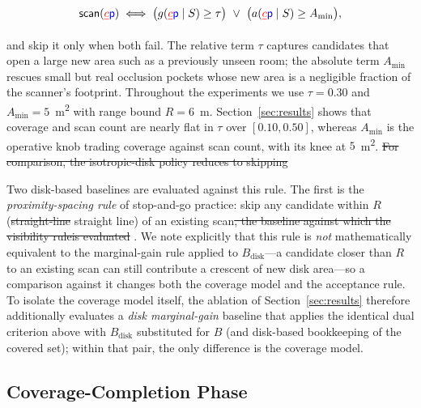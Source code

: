 \documentclass[sensors,article,submit,pdftex,moreauthors]{Definitions/mdpi}
\providecommand{\DIFadd}[1]{{\protect\color{blue} \sf #1}} %
\providecommand{\DIFdel}[1]{{\protect\color{red}\protect\scriptsize\protect\sout{#1}}} %
\providecommand{\DIFaddbegin}{} %
\providecommand{\DIFaddend}{} %
\providecommand{\DIFdelbegin}{} %
\providecommand{\DIFdelend}{} %
\begin{document}
\begin{equation}
\textsf{scan}(\DIFdelbegin \DIFdel{c}\DIFdelend \DIFaddbegin \DIFadd{p}\DIFaddend )\iff
\big(g(\DIFdelbegin \DIFdel{c}\DIFdelend \DIFaddbegin \DIFadd{p}\DIFaddend \mid S)\ge\tau\big)\ \lor\ \big(a(\DIFdelbegin \DIFdel{c}\DIFdelend \DIFaddbegin \DIFadd{p}\DIFaddend \mid S)\ge A_{\min}\big),
\end{equation}

and skip it only when both fail. The relative term $\tau$ captures candidates
that open a large new area such as a previously unseen room; the absolute term
$A_{\min}$ rescues small but real occlusion pockets whose new area is a
negligible fraction of the scanner's footprint. Throughout the experiments we
use $\tau=0.30$ and $A_{\min}=5$~m\textsuperscript{2} with range bound
$R=6$~m. Section~\ref{sec:results} shows that coverage and scan count are nearly
flat in $\tau$ over $[0.10,0.50]$, whereas $A_{\min}$ is the operative knob
trading coverage against scan count, with its knee at $5$~m\textsuperscript{2}.
\DIFdelbegin \DIFdel{For comparison, the
isotropic-disk policy reduces to skipping }\DIFdelend \DIFaddbegin 

\DIFadd{Two disk-based baselines are evaluated against this rule. The first is the
\emph{proximity-spacing rule} of stop-and-go practice: skip }\DIFaddend any candidate
within $R$ (\DIFdelbegin \DIFdel{straight-line}\DIFdelend \DIFaddbegin \DIFadd{straight line}\DIFaddend ) of an existing scan\DIFdelbegin \DIFdel{, the baseline against which the visibility ruleis evaluated}\DIFdelend \DIFaddbegin \DIFadd{. We note explicitly that this
rule is \emph{not} mathematically equivalent to the marginal-gain rule applied
to $B_{\mathrm{disk}}$---a candidate closer than $R$ to an existing scan can
still contribute a crescent of new disk area---so a comparison against it
changes both the coverage model and the acceptance rule. To isolate the
coverage model itself, the ablation of Section~\ref{sec:results} therefore
additionally evaluates a \emph{disk marginal-gain} baseline that applies the
identical dual criterion above with $B_{\mathrm{disk}}$ substituted for $B$
(and disk-based bookkeeping of the covered set); within that pair, the only
difference is the coverage model}\DIFaddend .

\subsection{Coverage-Completion Phase}
\end{document}

